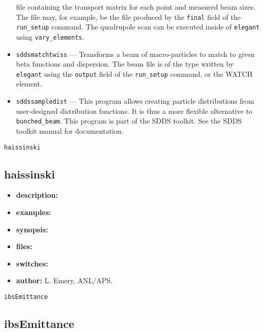 \documentclass[11pt]{article}
\begin{document}
\begin{itemize}
        file containing the transport matrix for each point and measured beam sizes.  
        The file may, for example, be the file produced
        by the {\tt final} field of the {\tt run\_setup} command.  The quadrupole scan can be
        executed inside of {\tt elegant} using {\tt vary\_elements}.
\item {\tt sddsmatchtwiss} --- Transforms a beam of macro-particles to match to given beta
        functions and dispersion.    The beam file
        is of the type written by {\tt elegant} using the {\tt output} field of the {\tt run\_setup}
        command, or the WATCH element.
\item {\tt sddssampledist} --- This program allows creating particle
        distributions from user-designed distribution functions.  It is thus a more flexible alternative
        to \verb|bunched_beam|.  This program is part of the SDDS toolkit.  See the SDDS toolkit
        manual for documentation.
\end{itemize}

\begin{latexonly}
\newpage
\begin{center}{\Large\verb|haissinski|}\end{center}
\end{latexonly}
\subsection{haissinski}

\begin{itemize}
\item {\bf description:}

\item {\bf examples:}

\item {\bf synopsis:}

\item {\bf files:}

\item {\bf switches:}

\item {\bf author:} L. Emery, ANL/APS.
\end{itemize}

\begin{latexonly}
\newpage
\begin{center}{\Large\verb|ibsEmittance|}\end{center}
\end{latexonly}
\subsection{ibsEmittance}
\end{document}

